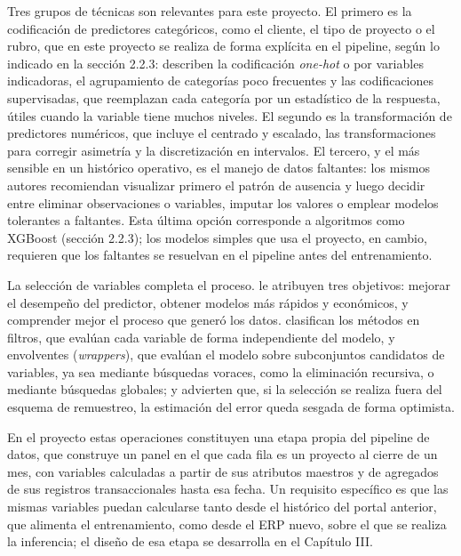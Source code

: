 Tres grupos de técnicas son relevantes para este proyecto. El primero es la codificación de predictores categóricos, como el cliente, el tipo de proyecto o el rubro, que en este proyecto se realiza de forma explícita en el pipeline, según lo indicado en la sección 2.2.3: \textcite{Kuhn2019} describen la codificación \textit{one-hot} o por variables indicadoras, el agrupamiento de categorías poco frecuentes y las codificaciones supervisadas, que reemplazan cada categoría por un estadístico de la respuesta, útiles cuando la variable tiene muchos niveles. El segundo es la transformación de predictores numéricos, que incluye el centrado y escalado, las transformaciones para corregir asimetría y la discretización en intervalos. El tercero, y el más sensible en un histórico operativo, es el manejo de datos faltantes: los mismos autores recomiendan visualizar primero el patrón de ausencia y luego decidir entre eliminar observaciones o variables, imputar los valores o emplear modelos tolerantes a faltantes. Esta última opción corresponde a algoritmos como XGBoost (sección 2.2.3); los modelos simples que usa el proyecto, en cambio, requieren que los faltantes se resuelvan en el pipeline antes del entrenamiento.

La selección de variables completa el proceso. \textcite{Guyon2003} le atribuyen tres objetivos: mejorar el desempeño del predictor, obtener modelos más rápidos y económicos, y comprender mejor el proceso que generó los datos. \textcite{Kuhn2019} clasifican los métodos en filtros, que evalúan cada variable de forma independiente del modelo, y envolventes (\textit{wrappers}), que evalúan el modelo sobre subconjuntos candidatos de variables, ya sea mediante búsquedas voraces, como la eliminación recursiva, o mediante búsquedas globales; y advierten que, si la selección se realiza fuera del esquema de remuestreo, la estimación del error queda sesgada de forma optimista.

En el proyecto estas operaciones constituyen una etapa propia del pipeline de datos, que construye un panel en el que cada fila es un proyecto al cierre de un mes, con variables calculadas a partir de sus atributos maestros y de agregados de sus registros transaccionales hasta esa fecha. Un requisito específico es que las mismas variables puedan calcularse tanto desde el histórico del portal anterior, que alimenta el entrenamiento, como desde el ERP nuevo, sobre el que se realiza la inferencia; el diseño de esa etapa se desarrolla en el Capítulo III\@.

